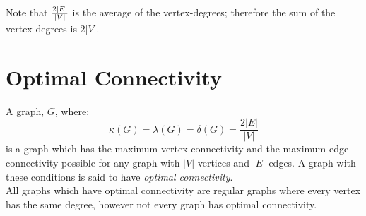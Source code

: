 Note that $\frac{2|E|}{|V|} \displaystyle$ is the average of the vertex-degrees; therefore the sum of the vertex-degrees is $2|V|$.  

\section{Optimal Connectivity}
A graph, $G$, where:
\[\kappa(G) = \lambda (G) = \delta (G) = \frac{2|E|}{|V|}\]
is a graph which has the maximum vertex-connectivity and the maximum edge-connectivity possible for any graph with $|V|$ vertices and $|E|$ edges. A graph with these conditions is said to have \textit{optimal connectivity}. \\

All graphs which have optimal connectivity are regular graphs where every vertex has the same degree, however not every graph has optimal connectivity. 